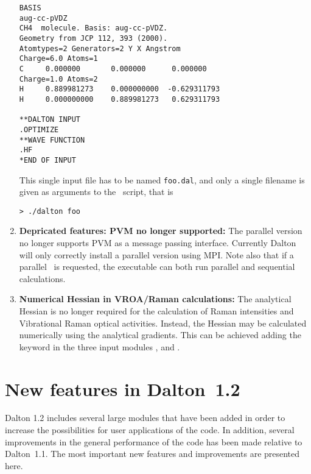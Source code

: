 \begin{enumerate}
\begin{verbatim}
BASIS
aug-cc-pVDZ
CH4  molecule. Basis: aug-cc-pVDZ.
Geometry from JCP 112, 393 (2000).
Atomtypes=2 Generators=2 Y X Angstrom
Charge=6.0 Atoms=1
C     0.000000       0.000000      0.000000
Charge=1.0 Atoms=2
H     0.889981273    0.000000000  -0.629311793
H     0.000000000    0.889981273   0.629311793

**DALTON INPUT
.OPTIMIZE
**WAVE FUNCTION
.HF
*END OF INPUT
\end{verbatim}
This single input file has to be named \verb|foo.dal|, and only a
single filename is given as arguments to the \dalton\ script, that is

\begin{verbatim}
> ./dalton foo
\end{verbatim}

\item{\bf Depricated features: PVM no longer supported:} The parallel
  version no longer supports PVM as a message passing
  interface. Currently Dalton will only correctly install a parallel
  version using MPI. Note also that if a parallel \dalton\ is
  requested, the executable can both run parallel and sequential
  calculations.



%
\item{\bf Numerical Hessian in VROA/Raman calculations:} The
  analytical Hessian is no longer required for the calculation of
  Raman intensities and Vibrational Raman optical activities. Instead,
  the Hessian may be calculated numerically using the analytical
  gradients. This can be achieved adding the keyword  in
  the three input modules ,  and .

\end{enumerate}

\section{New features in Dalton~1.2}
Dalton 1.2 includes several large modules that have been added in order
to increase the possibilities for user applications of the code. In
addition, several improvements in the general performance of the code
has been made relative to Dalton~1.1. The most important new features
and improvements are presented here.


